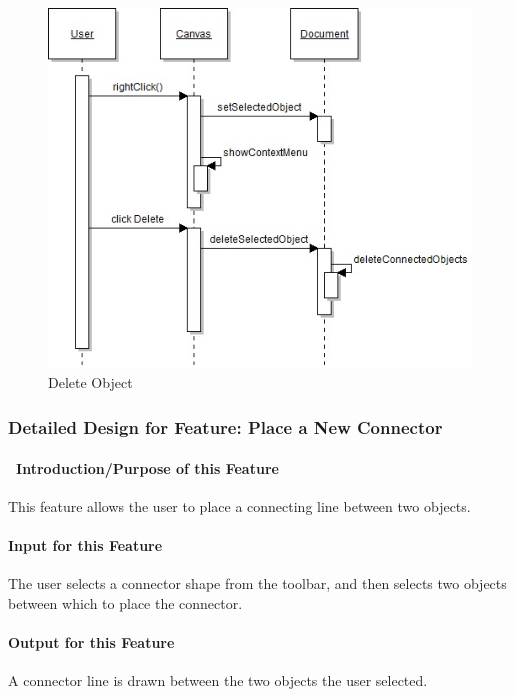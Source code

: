 \documentclass[twoside,letterpaper]{article}
\begin{document}
{\begin{figure}[h]
\centering
\includegraphics[width=6.0in]{IntDelObj.jpg}
\caption{Delete Object}
\end{figure}

\clearpage



% 
%

\subsubsection{Detailed Design for Feature: Place a New Connector}

\paragraph[\ Introduction/Purpose of this Feature]
{\ Introduction/Purpose of this Feature}
{
This feature allows the user to place a connecting line between two objects.
}

\paragraph[Input for this Feature]{Input for this Feature}
{
The user selects a connector shape from the toolbar, and then selects two objects between which to place the connector.
}

\paragraph{Output for this Feature}
{
A connector line is drawn between the two objects the user selected.
}

}
\end{document}
